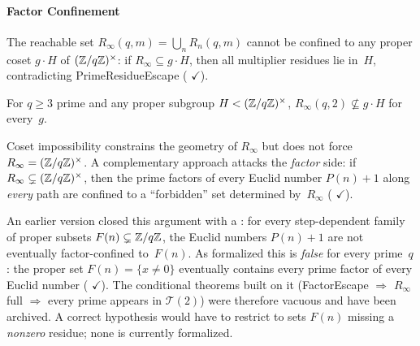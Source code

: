 \paragraph{Factor Confinement}
\label{sec:factor-confinement}

The reachable set $R_\infty(q, m) = \bigcup_n R_n(q, m)$ cannot be
confined to any proper coset $g \cdot H$ of $(\mathbb{Z}/q\mathbb{Z})^\times$:
if $R_\infty \subseteq g \cdot H$, then all multiplier residues lie
in~$H$, contradicting PrimeResidueEscape
(
{\color{leanink}$\checkmark$}).

\begin{theorem}
\label{thm:coset-impossibility}
For $q \geq 3$ prime and any proper subgroup $H < (\mathbb{Z}/q\mathbb{Z})^\times$,
$R_\infty(q, 2) \not\subseteq g \cdot H$ for every~$g$.
\end{theorem}

\noindent
Coset impossibility constrains the geometry of $R_\infty$ but does
not force $R_\infty = (\mathbb{Z}/q\mathbb{Z})^\times$.  A complementary approach
attacks the \emph{factor} side: if $R_\infty \subsetneq
(\mathbb{Z}/q\mathbb{Z})^\times$, then the prime factors of every Euclid number
$P(n){+}1$ along \emph{every} path are confined to a ``forbidden''
set determined by~$R_\infty$
(
{\color{leanink}$\checkmark$}).

\begin{remark}
\label{prop:factor-escape}
An earlier version closed this argument with a
: for every step-dependent family of
proper subsets $F(n) \subsetneq \mathbb{Z}/q\mathbb{Z}$, the Euclid numbers
$P(n){+}1$ are not eventually factor-confined to~$F(n)$.  As formalized
this is \emph{false} for every prime~$q$: the proper set
$F(n) = \{x \neq 0\}$ eventually contains every prime factor of every
Euclid number
(
{\color{leanink}$\checkmark$}).  The conditional theorems built on it
(FactorEscape $\Rightarrow$ $R_\infty$ full $\Rightarrow$ every prime
appears in $\mathcal{T}(2)$) were therefore vacuous and have been
archived.  A correct hypothesis would have to restrict to sets $F(n)$
missing a \emph{nonzero} residue; none is currently formalized.
\end{remark}


